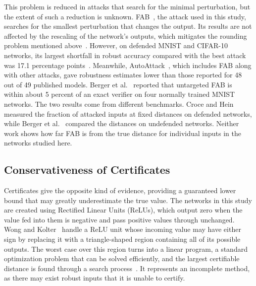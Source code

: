 This problem is reduced in attacks that search for the minimal perturbation, but the extent of such
a reduction is unknown. FAB~\cite{MapSource05}, the attack used in this study, searches for the
smallest perturbation that changes the output. Its results are not affected by the rescaling of the
network's outputs, which mitigates the rounding problem mentioned above~\cite[Prop.~2.1,
p.~5]{MapSource05}. However, on defended MNIST and CIFAR-10 networks, its largest shortfall in
robust accuracy compared with the best attack was 17.1 percentage points~\cite[Tab.~1,
p.~7]{MapSource05}. Meanwhile, AutoAttack~\cite[Sec.~6, p.~6]{MapSource24}, which includes FAB along
with other attacks, gave robustness estimates lower than those reported for 48 out of 49 published
models. Berger et al.~\cite[Tab.~1, p.~11]{Berger2026Upper} reported that untargeted FAB is within
about 5 percent of an exact verifier on four normally trained MNIST networks. The two results come
from different benchmarks. Croce and Hein~\cite{MapSource24} measured the fraction of attacked
inputs at fixed distances on defended networks, while Berger et al.~\cite{Berger2026Upper} compared
the distances on undefended networks. Neither work shows how far FAB is from the true distance for
individual inputs in the networks studied here.

\subsection{Conservativeness of Certificates}
\label{sec:lr-certificates}

Certificates give the opposite kind of evidence, providing a guaranteed lower bound that may greatly
underestimate the true value. The networks in this study are created using Rectified Linear Units
(ReLUs), which output zero when the value fed into them is negative and pass positive
values through unchanged. Wong and Kolter~\cite[Eq.~(3), p.~3]{MapSource09} handle a ReLU unit
whose incoming value may have either sign by
replacing it with a triangle-shaped region containing all of its possible outputs. The worst case
over this region turns into a linear program, a standard optimization problem that can be solved
efficiently, and the largest certifiable distance is found through a search process~\cite[Eq.~(17),
p.~6]{MapSource09}. It represents an incomplete method, as there may exist robust inputs that it is
unable to certify.

